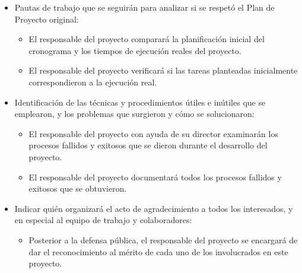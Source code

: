 \documentclass[
11pt, %
]{charter}
\begin{document}
\begin{itemize}
	\item Pautas de trabajo que se seguirán para analizar si se respetó el Plan de Proyecto original:
	
	 \begin{itemize}
	 \item El responsable del proyecto comparará la planificación inicial del cronograma y los tiempos de ejecución reales del proyecto.
	 
	 \item El responsable del proyecto verificará si las tareas planteadas inicialmente correspondieron a la ejecución real.
	  \end{itemize}
	\item Identificación de las técnicas y procedimientos útiles e inútiles que se emplearon, y los problemas que surgieron y cómo se solucionaron:
	
	 \begin{itemize}
	 \item El responsable del proyecto con ayuda de su director examinarán los procesos fallidos y exitosos que se dieron durante el desarrollo del proyecto.
	 
	  \item El responsable del proyecto documentará todos los procesos fallidos y exitosos que se obtuvieron. 
	  
	  \end{itemize}
	\item Indicar quién organizará el acto de agradecimiento a todos los interesados, y en especial al equipo de trabajo y colaboradores:
	
	  \begin{itemize}
	 \item Posterior a la defensa pública, el responsable del proyecto se encargará de dar el reconocimiento al mérito de cada uno de los involucrados en este proyecto.
	 
	  \end{itemize}
\end{itemize}
\end{document}
